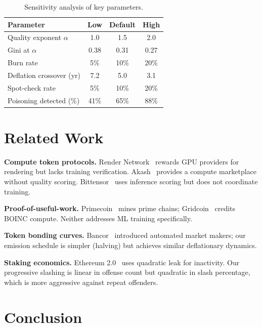 \documentclass[11pt,letterpaper]{article}
\begin{document}
\begin{table}[t]
\centering
\begin{tabular}{lccc}
\toprule
\textbf{Parameter} & \textbf{Low} & \textbf{Default} & \textbf{High} \\
\midrule
Quality exponent $\alpha$ & 1.0 & 1.5 & 2.0 \\
Gini at $\alpha$ & 0.38 & 0.31 & 0.27 \\
\midrule
Burn rate & 5\% & 10\% & 20\% \\
Deflation crossover (yr) & 7.2 & 5.0 & 3.1 \\
\midrule
Spot-check rate & 5\% & 10\% & 20\% \\
Poisoning detected (\%) & 41\% & 65\% & 88\% \\
\bottomrule
\end{tabular}
\caption{Sensitivity analysis of key parameters.}
\label{tab:sensitivity}
\end{table}

\section{Related Work}

\textbf{Compute token protocols.}  Render Network~\cite{render2020} rewards GPU providers for rendering but lacks training verification.  Akash~\cite{akash2020} provides a compute marketplace without quality scoring.  Bittensor~\cite{bittensor2023} uses inference scoring but does not coordinate training.

\textbf{Proof-of-useful-work.}  Primecoin~\cite{king2013primecoin} mines prime chains; Gridcoin~\cite{gridcoin2014} credits BOINC compute.  Neither addresses ML training specifically.

\textbf{Token bonding curves.}  Bancor~\cite{hertzog2017bancor} introduced automated market makers; our emission schedule is simpler (halving) but achieves similar deflationary dynamics.

\textbf{Staking economics.}  Ethereum 2.0~\cite{buterin2020serenity} uses quadratic leak for inactivity.  Our progressive slashing is linear in offense count but quadratic in slash percentage, which is more aggressive against repeat offenders.

\section{Conclusion}
\end{document}
